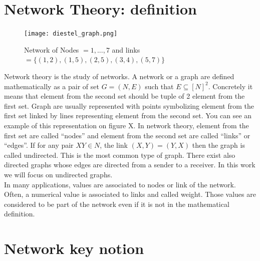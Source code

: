 \documentclass[a4paper, 12pt]{report}
\begin{document}
\section{Network Theory: definition}
\begin{figure}
\centering
\texttt{[image: diestel\_graph.png]}
\caption{Network of Nodes $= 1,...,7$ and links $= \{(1, 2), (1, 5), (2, 5), (3, 4), (5, 7)\}$  \citep{diestel}}
\label{diestel graph}
\end{figure}

Network theory is the study of networks. A  network or a graph are defined mathematically as a pair of set $G = (N, E)$ such that $E  \subseteq [N ]^2$. Concretely it means that element from the second set should be tuple of 2 element from the first set.
Graph are usually represented with points symbolizing element from the first set linked by lines representing element from the second set. You can see an example of this representation on figure X. In network theory, element from the first set are called ``nodes'' and element from the second set are called ``links'' or ``edges''. If for any pair $XY \in N$,  the link $(X,Y) = (Y,X)$ then the graph is called undirected. This is the most common type of graph. There exist also directed graphs whose edges are directed from a sender to a receiver. In this work we will focus on undirected graphs. \citep{diestel}\\

In many applications, values are associated to nodes or link of the network. Often, a numerical value is associated to links and called weight. Those values are considered to be part of the network even if it is not in the mathematical definition. 


\section{Network key notion}
\end{document}

